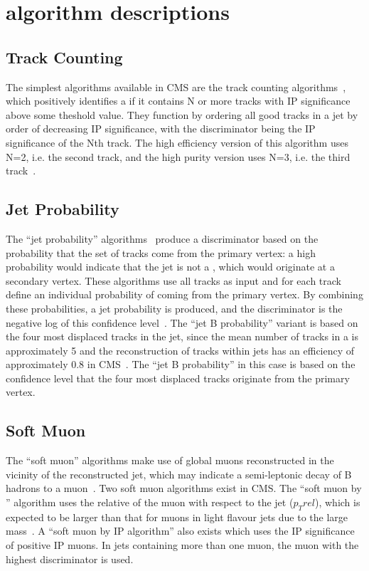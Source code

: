 \section{\btagging algorithm descriptions}
\label{s:btagging_algorithm_descriptions}

\subsection*{Track Counting}
\label{ss:track_counting}
The simplest \btagging algorithms available in CMS are the track counting
algorithms~\cite{CMS-PAS-BTV-09-001}, which positively identifies a \bjet if it contains N or more tracks with
IP significance above some theshold value. They function by ordering all good tracks in a jet by order of
decreasing IP significance, with the discriminator being the IP significance of the Nth track. The high
efficiency version of this algorithm uses N=2, i.e. the second track, and the high purity version uses N=3,
i.e. the third track~\cite{CMS-AN-2005-041}.

\subsection*{Jet Probability}
\label{ss:jet_probability}
The ``jet probability'' algorithms~\cite{CMS-PAS-BTV-09-001} produce a discriminator based on the probability that
the set of tracks come from the primary vertex: a high probability would indicate that the jet is not a \bjet,
which would originate at a secondary vertex. These algorithms use all tracks as input and for each track
define an individual probability of coming from the primary vertex. By combining these probabilities, a jet
probability is produced, and the discriminator is the negative log of this confidence
level~\cite{CMS-AN-2005-041}. The ``jet B probability'' variant is based on the four most displaced tracks in
the jet, since the mean number of tracks in a \bjet is approximately 5 and the reconstruction of tracks within
jets has an efficiency of approximately 0.8 in CMS~\cite{CMS-PAS-BTV-09-001}. The ``jet B probability'' in this
case is based on the confidence level that the four most displaced tracks originate from the primary vertex.

\subsection*{Soft Muon}
\label{ss:soft_muon}
The ``soft muon'' algorithms make use of global muons reconstructed in the vicinity of the reconstructed jet,
which may indicate a semi-leptonic decay of B hadrons to a muon~\cite{CMS-AN-2009-085}. Two soft muon
algorithms exist in CMS. The ``soft muon by \pt'' algorithm uses the relative \pt of the muon with respect to
the jet ($p_{T}{rel}$), which is expected to be larger than that for muons in light flavour jets due to the
large \bquark mass~\cite{CMS-AN-2009-085, Ferro:2012tg}. A ``soft muon by IP algorithm'' also exists which
uses the IP significance of positive IP muons. In jets containing more than one muon, the muon with the
highest discriminator is used.

